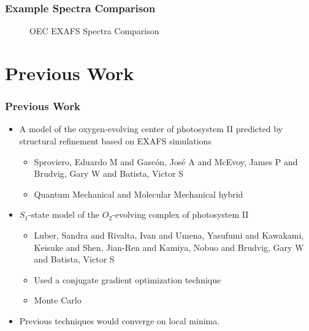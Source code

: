 \documentclass[10pt]{beamer}
\begin{document}
\begin{frame}
	\frametitle{Example Spectra Comparison}

	\begin{figure}
		\caption{OEC EXAFS Spectra Comparison}
	\end{figure}

\end{frame}

\section{Previous Work}

\begin{frame}
	\frametitle{Previous Work}

	\begin{itemize}
		\item A model of the oxygen-evolving center of photosystem II predicted by structural refinement based on EXAFS simulations
			\begin{itemize}
				\item Sproviero, Eduardo M and Gasc{\'o}n, Jos{\'e} A and McEvoy, James P and Brudvig, Gary W and Batista, Victor S
				\item Quantum Mechanical and Molecular Mechanical hybrid
			\end{itemize}
		\item $S_{1}$-state model of the $O_{2}$-evolving complex of photosystem II
			\begin{itemize}
				\item Luber, Sandra and Rivalta, Ivan and Umena, Yasufumi and Kawakami, Keisuke and Shen, Jian-Ren and Kamiya, Nobuo and Brudvig, Gary W and Batista, Victor S
				\item Used a conjugate gradient optimization technique
				\item Monte Carlo
			\end{itemize}	
		\item Previous techniques would converge on local minima.
	\end{itemize}

\end{frame}
\end{document}
